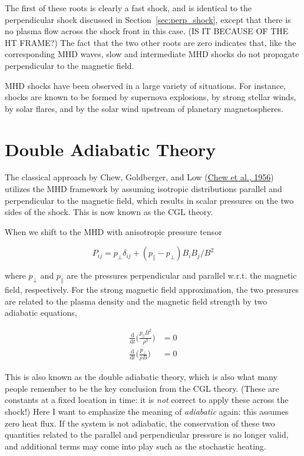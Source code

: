 \documentclass[
  notoc %
]{tufte-book}
\begin{document}
The first of these roots is clearly a fast shock, and is identical to
the perpendicular shock discussed in Section~\ref{sec:perp_shock},
except that there is no plasma flow across the shock front in this case.
(IS IT BECAUSE OF THE HT FRAME?) The fact that the two other roots are
zero indicates that, like the corresponding MHD waves, slow and
intermediate MHD shocks do not propagate perpendicular to the magnetic
field.

MHD shocks have been observed in a large variety of situations. For
instance, shocks are known to be formed by supernova explosions, by
strong stellar winds, by solar flares, and by the solar wind upstream of
planetary magnetospheres.

\hypertarget{double-adiabatic-theory}{%
\section{Double Adiabatic Theory}\label{double-adiabatic-theory}}

The classical approach by Chew, Goldberger, and Low
(\protect\hyperlink{ref-cgl1956}{Chew et al., 1956}) utilizes the MHD
framework by assuming isotropic distributions parallel and perpendicular
to the magnetic field, which results in scalar pressures on the two
sides of the shock. This is now known as the CGL theory.

When we shift to the MHD with anisotropic pressure tensor

\[
P_{ij} = p_\perp \delta_{ij} + (p_\parallel - p_\perp)B_i B_j / B^2
\]

where \(p_\perp\) and \(p_\parallel\) are the pressures perpendicular
and parallel w.r.t. the magnetic field, respectively. For the strong
magnetic field approximation, the two pressures are related to the
plasma density and the magnetic field strength by two adiabatic
equations,

\[
\begin{aligned}
\frac{\mathrm{d}}{\mathrm{d}t}\Big( \frac{p_\parallel B^2}{\rho^3} \Big) &= 0 \\
\frac{\mathrm{d}}{\mathrm{d}t}\Big( \frac{p_\perp}{\rho B} \Big) &= 0
\end{aligned}
\]

This is also known as the double adiabatic theory, which is also what
many people remember to be the key conclusion from the CGL theory.
(These are constants at a fixed location in time: it is \emph{not}
correct to apply these across the shock!) Here I want to emphasize the
meaning of \emph{adiabatic} again: this assumes zero heat flux. If the
system is not adiabatic, the conservation of these two quantities
related to the parallel and perpendicular pressure is no longer valid,
and additional terms may come into play such as the stochastic heating.
\end{document}
